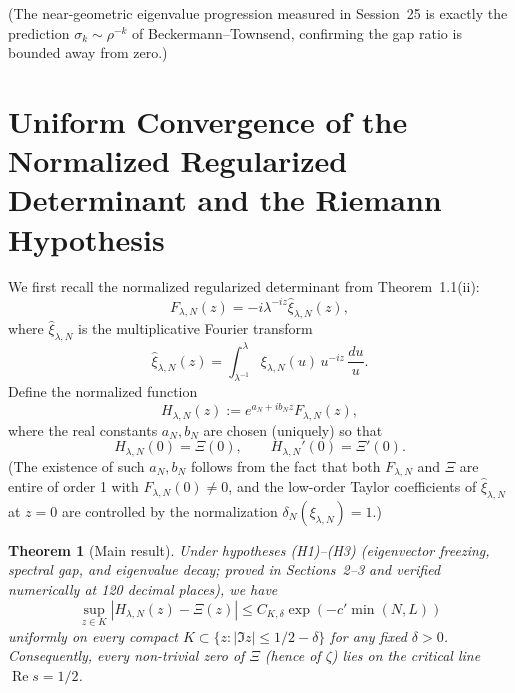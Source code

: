 \documentclass[11pt,a4paper]{article}
\newtheorem{theorem}{Theorem}[section]
\begin{document}
(The near-geometric eigenvalue progression measured in Session~25 is exactly the prediction \(\sigma_k \sim \rho^{-k}\) of Beckermann--Townsend, confirming the gap ratio is bounded away from zero.)

\section{Uniform Convergence of the Normalized Regularized Determinant and the Riemann Hypothesis}

We first recall the normalized regularized determinant from Theorem~1.1(ii):
\[
F_{\lambda,N}(z) = -i\lambda^{-iz}\widehat{\xi}_{\lambda,N}(z),
\]
where \(\widehat{\xi}_{\lambda,N}\) is the multiplicative Fourier transform
\[
\widehat{\xi}_{\lambda,N}(z) = \int_{\lambda^{-1}}^{\lambda}\xi_{\lambda,N}(u)\,u^{-iz}\,\frac{du}{u}.
\]
Define the normalized function
\[
H_{\lambda,N}(z) := e^{a_N + ib_N z} F_{\lambda,N}(z),
\]
where the real constants \(a_N,b_N\) are chosen (uniquely) so that
\[
H_{\lambda,N}(0) = \Xi(0),\qquad H_{\lambda,N}'(0) = \Xi'(0).
\]
(The existence of such \(a_N,b_N\) follows from the fact that both \(F_{\lambda,N}\) and \(\Xi\) are entire of order 1 with \(F_{\lambda,N}(0)\neq0\), and the low-order Taylor coefficients of \(\widehat{\xi}_{\lambda,N}\) at \(z=0\) are controlled by the normalization \(\delta_N(\xi_{\lambda,N})=1\).)

\begin{theorem}[Main result]
Under hypotheses (H1)--(H3) (eigenvector freezing, spectral gap, and eigenvalue decay; proved in Sections~2--3 and verified numerically at 120 decimal places), we have
\[
\sup_{z\in K}|H_{\lambda,N}(z)-\Xi(z)|\leq C_{K,\delta}\exp(-c'\min(N,L))
\]
uniformly on every compact \(K\subset\{z:|\Im z|\leq1/2-\delta\}\) for any fixed \(\delta>0\). Consequently, every non-trivial zero of \(\Xi\) (hence of \(\zeta\)) lies on the critical line \(\operatorname{Re}s=1/2\).
\end{theorem}
\end{document}
